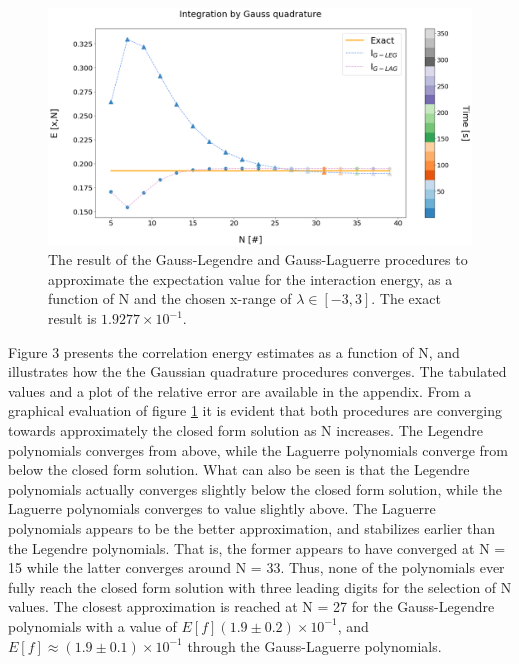 \documentclass[%
reprint,nofootinbib,
amsmath,amssymb,
aps,
]{revtex4-1}
\begin{document}
\begin{figure}[!ht]
	\includegraphics[scale = 0.4]{Gauss_lagleg_2.png}
	\caption{\label{integrated_results} The result of the Gauss-Legendre and Gauss-Laguerre procedures to approximate the expectation value for the interaction energy, as a function of N and the chosen x-range of $\lambda \in[-3,3]$. The exact result is $1.9277\times 10^{-1}$. \vspace{2cm}}
\end{figure}
\noindent 
Figure 3 presents the correlation energy estimates as a function of N, and illustrates how the the Gaussian quadrature procedures converges. The tabulated values and a plot of the relative error are available in the appendix. From a graphical evaluation of figure \ref{integrated_results} it is evident that both procedures are converging towards approximately the closed form solution as N increases. The Legendre polynomials converges from above, while the Laguerre polynomials converge from below the closed form solution. What can also be seen is that the Legendre polynomials actually converges slightly below the closed form solution, while the Laguerre polynomials converges to value slightly above. The Laguerre polynomials appears to be the better approximation, and stabilizes earlier than the Legendre polynomials. That is, the former appears to have converged at N = 15 while the latter converges around N = 33. Thus, none of the polynomials ever fully reach the closed form solution with three leading digits for the selection of N values. The closest approximation is reached at N = 27 for the Gauss-Legendre polynomials with a value of $E[f] (1.9 \pm 0.2)\times 10^{-1}$, and $E[f]\approx (1.9 \pm 0.1)\times 10^{-1}$ through the Gauss-Laguerre polynomials. \newpage   \indent 
\end{document}
